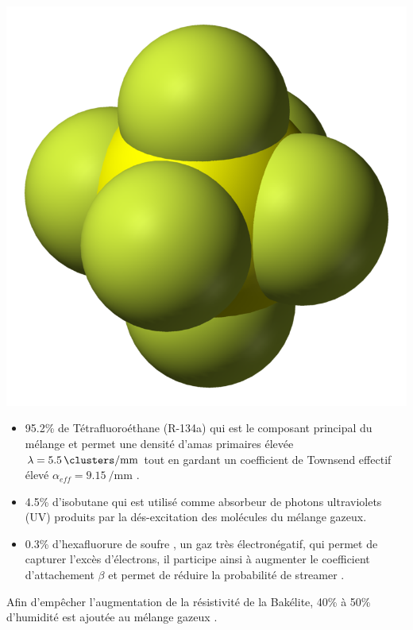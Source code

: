 \marginpar
{
	\centering
	\includegraphics[width=\marginparwidth]{RPC/Sulfurhexafluoride.png}
	\label{hexa}
}

\begin{itemize}[label=$\bullet$]
\item \num{95.2}\% de Tétrafluoroéthane  (R-134a) qui est le composant principal du mélange et permet une densité d'amas primaires élevée $\lambda=\SI{5.5}{\clusters\per\milli\meter}$ tout en gardant un coefficient de Townsend effectif élevé $\alpha_{eff}=\SI{9.15}{\per\milli\meter}$ \cite{CMS-NOTE-1997-004}.
\item \num{4.5}\% d'isobutane  qui est utilisé comme absorbeur de photons ultraviolets (UV) produits par la dés-excitation des molécules du mélange gazeux.
\item \num{0.3}\% d'hexafluorure de soufre , un gaz très électronégatif, qui permet de capturer l'excès d'électrons, il participe ainsi à augmenter le coefficient d'attachement $\beta$ et permet de réduire la probabilité de streamer \cite{Camarri:685607}.
\end{itemize}

Afin d'empêcher l'augmentation de la résistivité de la Bakélite, \num{40}\% à \num{50}\% d'humidité est ajoutée au mélange gazeux \cite{Abbrescia:2004fv}.

